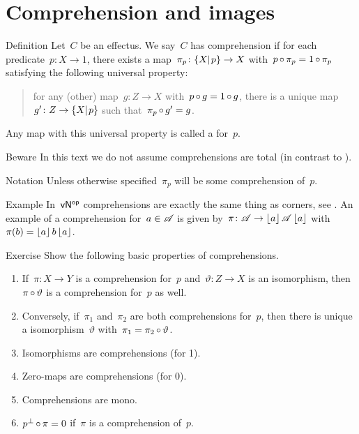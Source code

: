 \documentclass[b]{subfiles}
\begin{document}
\section{Comprehension and images}
\begin{parsec}%
\begin{point}{Definition}%
Let~$C$ be an effectus.
We say~$C$ has comprehension
    if for each predicate~$p \colon X \to 1$,
    there exists a map~$\pi_p \colon \{X|{\kern.2ex}p\} \to X$
    with~$p \mathop{\circ} \pi_p = 1 \mathop{\circ} \pi_p$
    satisfying the following universal property:
\begin{quote}
    for any (other) map~$g\colon Z \to X$
        with~$p \mathop{\circ} g = 1 \mathop{\circ} g$,
        there is a unique map~$g' \colon Z \to \{X|{\kern.2ex}p\}$
        such that~$\pi_p \mathop{\circ} g' = g$.
\end{quote}
Any  map with this universal property
    is called a  for~$p$.
\begin{point}{Beware}%
    In this text we do not assume comprehensions are total
        (in contrast to \TODO{}).
\end{point}
\begin{point}{Notation}%
Unless otherwise specified~$\pi_p$ will be some
    comprehension of~$p$.
\end{point}
\end{point}
\begin{point}{Example}%
In~${\mathsf{vN}}{^{\mathsf{op}}}$ comprehensions are exactly the same thing
as corners, see .
An example of a comprehension for~$a \in \mathscr{A}$
    is given by~$\pi\colon \mathscr{A} \to \left\lfloor a\right\rfloor\mathscr{A}\left\lfloor a\right\rfloor$
    with~$\pi(b) = \left\lfloor a\right\rfloor b\left\lfloor a\right\rfloor$.
\end{point}
\begin{point}{Exercise}%
Show the following basic properties of comprehensions.
\begin{enumerate}
    \item If~$\pi\colon X \to Y$ is a comprehension for~$p$
                and~$\vartheta\colon Z \to X$ is an isomorphism,
                then~$\pi \mathop{\circ} \vartheta$ is a comprehension for~$p$
                as well.
    \item Conversely, if~$\pi_1$ and~$\pi_2$
            are both comprehensions for~$p$,
            then there is unique a isomorphism~$\vartheta$
            with~$\pi_1 = \pi_2 \mathop{\circ} \vartheta$.
    \item Isomorphisms are comprehensions (for 1).
    \item Zero-maps are comprehensions (for 0).
    \item Comprehensions are mono.
    \item $p^\perp \mathop{\circ} \pi = 0$ if~$\pi$ is a comprehension of~$p$.
\end{enumerate}
\end{point}
\end{parsec}
\end{document}
